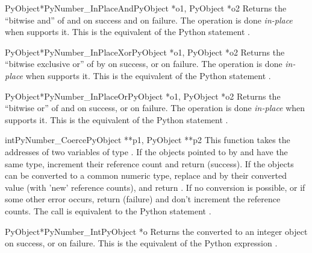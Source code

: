 \documentclass{manual}
\begin{document}
\begin{cfuncdesc}{PyObject*}{PyNumber_InPlaceAnd}{PyObject *o1, PyObject *o2}
Returns the ``bitwise and'' of  and  on success
and \NULL{} on failure. The operation is done \emph{in-place} when
 supports it.  This is the equivalent of the Python statement
.
\end{cfuncdesc}


\begin{cfuncdesc}{PyObject*}{PyNumber_InPlaceXor}{PyObject *o1, PyObject *o2}
Returns the ``bitwise exclusive or'' of  by  on
success, or \NULL{} on failure.  The operation is done \emph{in-place}
when  supports it.  This is the equivalent of the Python
statement .
\end{cfuncdesc}

\begin{cfuncdesc}{PyObject*}{PyNumber_InPlaceOr}{PyObject *o1, PyObject *o2}
Returns the ``bitwise or'' of  and  on success, or
\NULL{} on failure.  The operation is done \emph{in-place} when
 supports it.  This is the equivalent of the Python statement
.
\end{cfuncdesc}

\begin{cfuncdesc}{int}{PyNumber_Coerce}{PyObject **p1, PyObject **p2}
This function takes the addresses of two variables of type
.  If the objects pointed to by  and
 have the same type, increment their reference count
and return  (success). If the objects can be converted to a
common numeric type, replace  and  by their
converted value (with 'new' reference counts), and return .
If no conversion is possible, or if some other error occurs, return
 (failure) and don't increment the reference counts.  The
call  is equivalent to the Python
statement .
\end{cfuncdesc}

\begin{cfuncdesc}{PyObject*}{PyNumber_Int}{PyObject *o}
Returns the  converted to an integer object on success, or
\NULL{} on failure.  This is the equivalent of the Python
expression .
\end{cfuncdesc}
\end{document}
